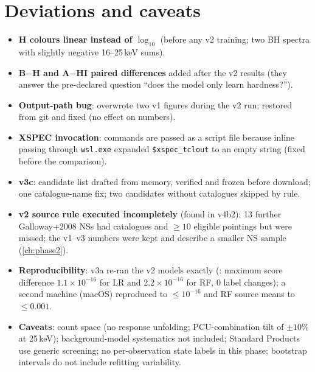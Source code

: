 \section{Deviations and caveats}
\begin{itemize}
\item \textbf{H colours linear instead of $\log_{10}$} (before any v2 training; two BH spectra with slightly negative
16--25\,keV sums).
\item \PostHoc{} \textbf{B$-$H and A$-$HI paired differences} added after the v2 results (they answer the pre-declared
question ``does the model only learn hardness?'').
\item \textbf{Output-path bug}:  overwrote two v1 figures during the v2 run; restored from git and fixed (no effect on numbers).
\item \textbf{XSPEC invocation}: commands are passed as a script file because inline passing through \texttt{wsl.exe}
expanded \texttt{\$xspec\_tclout} to an empty string (fixed before the comparison).
\item \textbf{v3c}: candidate list drafted from memory, verified and frozen before download; one catalogue-name fix; two
candidates without catalogues skipped by rule.
\item \textbf{v2 source rule executed incompletely} (found in v4b2): 13 further Galloway+2008 NSs had catalogues and
$\ge10$ eligible pointings but were missed; the v1--v3 numbers were kept and describe a smaller NS sample (\cref{ch:phase2}).
\item \textbf{Reproducibility}: v3a re-ran the v2 models exactly (: maximum
score difference $1.1\times10^{-16}$ for LR and $2.2\times10^{-16}$ for RF, 0 label changes); a second machine (macOS) reproduced
 to $\le10^{-16}$ and RF source means to $\le0.001$.
\item \textbf{Caveats}: count space (no response unfolding; PCU-combination tilt of $\pm10\%$ at 25\,keV); background-model
systematics not included; Standard Products use generic screening; no per-observation state labels in this phase;
bootstrap intervals do not include refitting variability.
\end{itemize}

